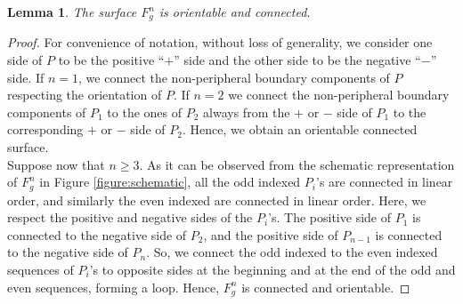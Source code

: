 \documentclass[reqno]{amsart}
\newtheorem{lem}{Lemma}
\theoremstyle{definition}
\theoremstyle{remark}
\begin{document}
\begin{lem}\label{lemma:orientable}
The surface $F_g^n$ is orientable and connected.
\end{lem}
\begin{proof} For convenience of notation, without loss of generality, we consider one side of $P$ to be the positive ``$+$'' side and the other side to be the negative ``$-$'' side.
	If $n=1$, we connect the non-peripheral boundary components of $P$ respecting the orientation of $P$.  If $n=2$ we connect the non-peripheral boundary components of $P_1$ to the ones of $P_2$ always from the $+$ or $-$ side of $P_1$ to the corresponding $+$ or $-$ side of $P_2$. Hence, we obtain an orientable connected surface. \\  
	Suppose now that $n\geq 3$. As it can be observed from the schematic representation of $F_g^n$ in Figure \ref{figure:schematic},  all the odd indexed $P_i$'s are connected in linear order, and similarly the even indexed are connected in linear order.  Here, we respect the positive and negative sides of the $P_i$'s. The positive side of $P_1$ is connected to the negative side of $P_2$, and the positive side of $P_{n-1}$ is connected to the negative side of $P_n$.  So, we connect the odd indexed to the even indexed sequences of $P_i$'s to opposite sides at the beginning and at the end of the odd and even sequences, forming a loop. Hence,  $F_g^n$ is connected and orientable. 
\end{proof}
\end{document}
